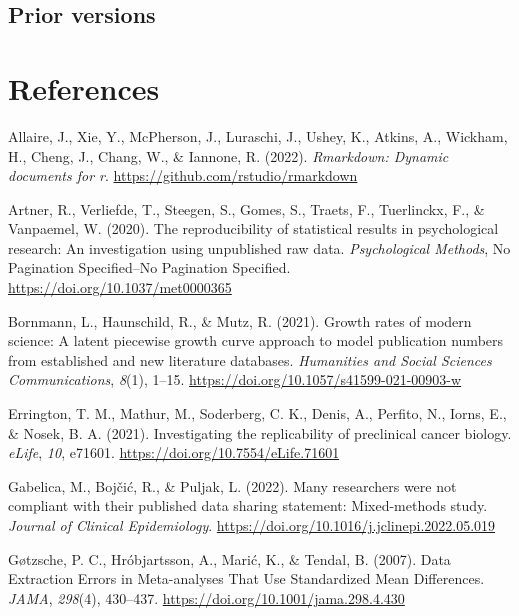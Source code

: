 \documentclass[
  ,jou, a4paper,floatsintext]{apa6}
\newlength{\cslhangindent}
\newlength{\cslentryspacingunit} %
\newenvironment{CSLReferences}[2] %
 {%
  \setlength{\parindent}{0pt}
  \ifodd #1
  \let\oldpar\par
  \def\par{\hangindent=\cslhangindent\oldpar}
  \fi
  \setlength{\parskip}{#2\cslentryspacingunit}
 }%
 {}
\begin{document}
\hypertarget{prior-versions}{%
\subsection{Prior versions}\label{prior-versions}}

\hypertarget{references}{%
\section*{References}\label{references}}

\hypertarget{refs}{}
\begin{CSLReferences}{1}{0}
\leavevmode{}%
Allaire, J., Xie, Y., McPherson, J., Luraschi, J., Ushey, K., Atkins, A., Wickham, H., Cheng, J., Chang, W., \& Iannone, R. (2022). \emph{Rmarkdown: Dynamic documents for r}. \url{https://github.com/rstudio/rmarkdown}

\leavevmode{}%
Artner, R., Verliefde, T., Steegen, S., Gomes, S., Traets, F., Tuerlinckx, F., \& Vanpaemel, W. (2020). The reproducibility of statistical results in psychological research: {An} investigation using unpublished raw data. \emph{Psychological Methods}, No Pagination Specified--No Pagination Specified. \url{https://doi.org/10.1037/met0000365}

\leavevmode{}%
Bornmann, L., Haunschild, R., \& Mutz, R. (2021). Growth rates of modern science: A latent piecewise growth curve approach to model publication numbers from established and new literature databases. \emph{Humanities and Social Sciences Communications}, \emph{8}(1), 1--15. \url{https://doi.org/10.1057/s41599-021-00903-w}

\leavevmode{}%
Errington, T. M., Mathur, M., Soderberg, C. K., Denis, A., Perfito, N., Iorns, E., \& Nosek, B. A. (2021). Investigating the replicability of preclinical cancer biology. \emph{eLife}, \emph{10}, e71601. \url{https://doi.org/10.7554/eLife.71601}

\leavevmode{}%
Gabelica, M., Bojčić, R., \& Puljak, L. (2022). Many researchers were not compliant with their published data sharing statement: Mixed-methods study. \emph{Journal of Clinical Epidemiology}. \url{https://doi.org/10.1016/j.jclinepi.2022.05.019}

\leavevmode{}%
Gøtzsche, P. C., Hróbjartsson, A., Marić, K., \& Tendal, B. (2007). Data {Extraction Errors} in {Meta-analyses That Use Standardized Mean Differences}. \emph{JAMA}, \emph{298}(4), 430--437. \url{https://doi.org/10.1001/jama.298.4.430}


\end{CSLReferences}
\end{document}
